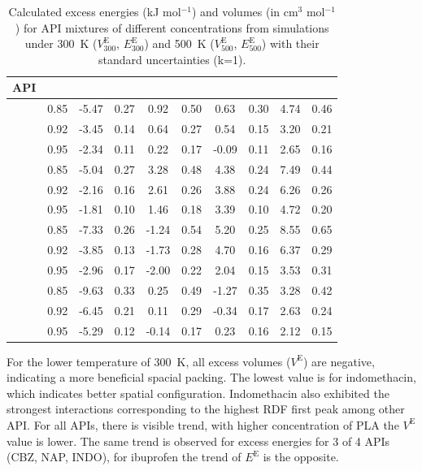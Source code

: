 \begin{table}[htb]
	\caption{Calculated excess energies (kJ mol$^{-1}$) and volumes (in cm$^3$ mol$^{-1}$) for API mixtures of different concentrations from simulations under 300~K ($V_{300}^\text{E}$, $E_{300}^\text{E}$) and 500~K ($V_{500}^\text{E}$, $E_{500}^\text{E}$) with their standard uncertainties (k=1).}
	\vspace{-0.2cm}
	\centering
	\begin{tabular}{lSSSSSSSSS}
	\toprule
	\textbf{API} &  &  &  &  &  &  &  &  &  \\
	\midrule
		 & 0.85 & -5.47 & 0.27 & 0.92 & 0.50 & 0.63 & 0.30 & 4.74 & 0.46 \\
		& 0.92 & -3.45 & 0.14 & 0.64 & 0.27 & 0.54 & 0.15 & 3.20 & 0.21 \\
		& 0.95 & -2.34 & 0.11 & 0.22 & 0.17 & -0.09 & 0.11 & 2.65 & 0.16 \\
		\midrule
		 & 0.85 & -5.04 & 0.27 & 3.28 & 0.48 & 4.38 & 0.24 & 7.49 & 0.44 \\
		& 0.92 & -2.16 & 0.16 & 2.61 & 0.26 & 3.88 & 0.24 & 6.26 & 0.26 \\
		& 0.95 & -1.81 & 0.10 & 1.46 & 0.18 & 3.39 & 0.10 & 4.72 & 0.20 \\
		\midrule
		 & 0.85 & -7.33 & 0.26 & -1.24 & 0.54 & 5.20 & 0.25 & 8.55 & 0.65 \\
		& 0.92 & -3.85 & 0.13 & -1.73 & 0.28 & 4.70 & 0.16 & 6.37 & 0.29 \\
		& 0.95 & -2.96 & 0.17 & -2.00 & 0.22 & 2.04 & 0.15 & 3.53 & 0.31 \\
		\midrule
		 & 0.85 & -9.63 & 0.33 & 0.25 & 0.49 & -1.27 & 0.35 & 3.28 & 0.42 \\
		& 0.92 & -6.45 & 0.21 & 0.11 & 0.29 & -0.34 & 0.17 & 2.63 & 0.24 \\
		& 0.95 & -5.29 & 0.12 & -0.14 & 0.17 & 0.23 & 0.16 & 2.12 & 0.15 \\
	\bottomrule
	\end{tabular}
	\label{tab:vobjemy} 
\end{table}

For the lower temperature of 300~K, all excess volumes ($V^\text{E}$) are negative, indicating a more beneficial spacial packing. The lowest value is for indomethacin, which indicates better spatial configuration. Indomethacin also exhibited the strongest interactions corresponding to the highest RDF first peak among other API. For all APIs, there is visible trend, with higher concentration of PLA the $V^\text{E}$ value is lower. The same trend is observed for excess energies for 3 of 4 APIs (CBZ, NAP, INDO), for ibuprofen the trend of $E^\text{E}$ is the opposite. 

